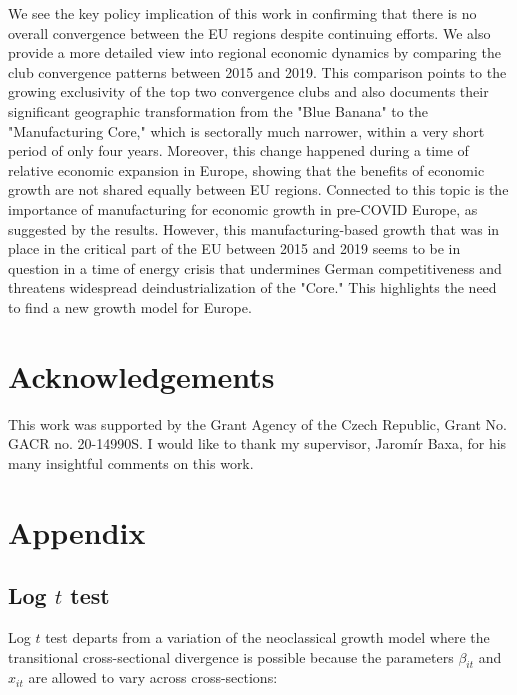 \documentclass[11pt]{article}
\begin{document}
We see the key policy implication of this work in confirming that there is no overall convergence between the EU regions despite continuing efforts. We also provide a more detailed view into regional economic dynamics by comparing the club convergence patterns between 2015 and 2019. This comparison points to the growing exclusivity of the top two convergence clubs and also documents their significant geographic transformation from the "Blue Banana" to the "Manufacturing Core," which is sectorally much narrower, within a very short period of only four years. Moreover, this change happened during a time of relative economic expansion in Europe, showing that the benefits of economic growth are not shared equally between EU regions. Connected to this topic is the importance of manufacturing for economic growth in pre-COVID Europe, as suggested by the results. However, this manufacturing-based growth that was in place in the critical part of the EU between 2015 and 2019 seems to be in question in a time of energy crisis that undermines German competitiveness and threatens widespread deindustrialization of the "Core." This highlights the need to find a new growth model for Europe.

\section{Acknowledgements} 
This work was supported by the Grant Agency of the Czech Republic, Grant No. GACR no. 20-14990S. I would like to thank my supervisor, Jaromír Baxa, for his many insightful comments on this work.


\newpage


\appendix
\section{Appendix}
\setcounter{table}{0}
\renewcommand{\thetable}{A\arabic{table}}
\renewcommand{\thefigure}{A\arabic{figure}}
\setcounter{figure}{0}

\subsection{Log $t$ test}

Log $t$ test departs from a variation of the neoclassical growth model where the transitional cross-sectional divergence is possible because the parameters $\beta_{it}$ and $x_{it}$ are allowed to vary across cross-sections:
\end{document}
